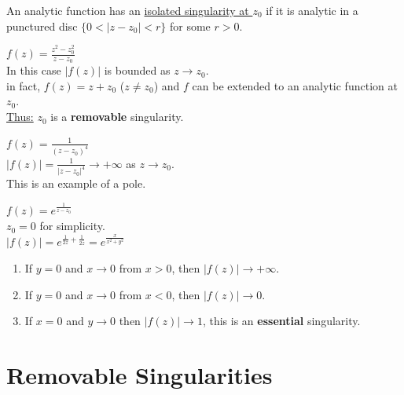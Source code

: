 \begin{definition}
    An analytic function has an \underline{isolated singularity at $z_0$} if it is analytic in a punctured disc $\{0 < |z - z_0| < r\}$ for some $r > 0$.
\end{definition}

\begin{example}
    $f(z) = \frac{z^2 - z_0^2}{z - z_0}$\\
    In this case $|f(z)|$ is bounded as $z \to z_0$. \\
    in fact, $f(z) = z + z_0$ ($z \neq z_0$) and $f$ can be extended to an analytic function at $z_0$.\\
    \underline{Thus:} $z_0$ is a \textbf{removable} singularity.
\end{example}

\begin{example}
    $f(z) = \frac{1}{(z - z_0)^4}$ \\

    $|f(z)| = \frac{1}{|z - z_0|^4} \to +\infty$ as $z \to z_0$.\\
    This is an example of a pole.
\end{example}

\begin{example}
    $f(z) = e^{\frac{1}{z - z_0}}$ \\

    $z_0 = 0$ for simplicity. \\
    $|f(z)| = e^{\frac{1}{2z} + \frac{1}{2\overline{z}}} = e^{\frac{x}{x^2 + y^2}}$ \\

    \begin{enumerate}
        \item If $y = 0$ and $x \to 0$ from $x > 0$, then $|f(z)| \to +\infty$.
        \item If $y = 0$ and $x \to 0$ from $x < 0$, then $|f(z)| \to 0$.
        \item If $x = 0$ and $y \to 0$ then $|f(z)| \to 1$, this is an \textbf{essential} singularity.
    \end{enumerate}
\end{example}

\section{Removable Singularities}

